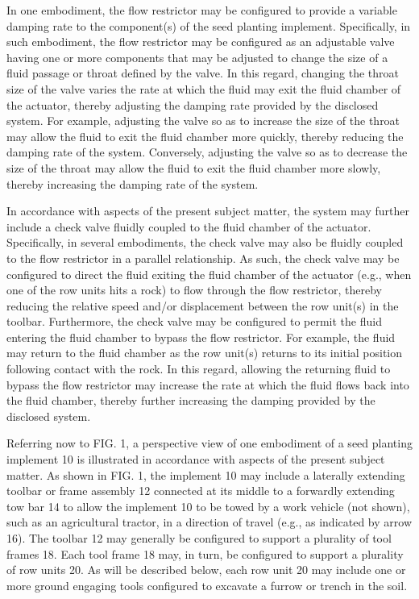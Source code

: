 \documentclass[11pt,a4paper]{article}
\begin{document}
In one embodiment, the flow restrictor may be configured to provide a variable damping rate to the component(s) of the seed planting implement. Specifically, in such embodiment, the flow restrictor may be configured as an adjustable valve having one or more components that may be adjusted to change the size of a fluid passage or throat defined by the valve. In this regard, changing the throat size of the valve varies the rate at which the fluid may exit the fluid chamber of the actuator, thereby adjusting the damping rate provided by the disclosed system. For example, adjusting the valve so as to increase the size of the throat may allow the fluid to exit the fluid chamber more quickly, thereby reducing the damping rate of the system. Conversely, adjusting the valve so as to decrease the size of the throat may allow the fluid to exit the fluid chamber more slowly, thereby increasing the damping rate of the system.

In accordance with aspects of the present subject matter, the system may further include a check valve fluidly coupled to the fluid chamber of the actuator. Specifically, in several embodiments, the check valve may also be fluidly coupled to the flow restrictor in a parallel relationship. As such, the check valve may be configured to direct the fluid exiting the fluid chamber of the actuator (e.g., when one of the row units hits a rock) to flow through the flow restrictor, thereby reducing the relative speed and/or displacement between the row unit(s) in the toolbar. Furthermore, the check valve may be configured to permit the fluid entering the fluid chamber to bypass the flow restrictor. For example, the fluid may return to the fluid chamber as the row unit(s) returns to its initial position following contact with the rock. In this regard, allowing the returning fluid to bypass the flow restrictor may increase the rate at which the fluid flows back into the fluid chamber, thereby further increasing the damping provided by the disclosed system.

Referring now to FIG. 1, a perspective view of one embodiment of a seed planting implement 10 is illustrated in accordance with aspects of the present subject matter. As shown in FIG. 1, the implement 10 may include a laterally extending toolbar or frame assembly 12 connected at its middle to a forwardly extending tow bar 14 to allow the implement 10 to be towed by a work vehicle (not shown), such as an agricultural tractor, in a direction of travel (e.g., as indicated by arrow 16). The toolbar 12 may generally be configured to support a plurality of tool frames 18. Each tool frame 18 may, in turn, be configured to support a plurality of row units 20. As will be described below, each row unit 20 may include one or more ground engaging tools configured to excavate a furrow or trench in the soil.
\end{document}
